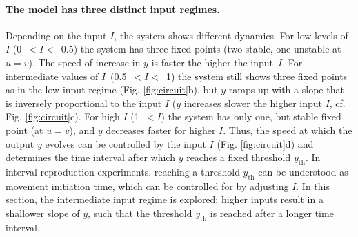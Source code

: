 \documentclass[10pt, a4paper]{article}
\begin{document}
\paragraph{The model has three distinct input regimes.}
Depending on the input $I$, the system shows different dynamics.
For low levels of~$I$ (0~$<I<$~0.5) the system has three fixed points (two stable, one unstable at $u=v$). 
The speed of increase in $y$ is faster the higher the input~$I$. 
For intermediate values of $I$~(0.5~$<I<$~1) the system still shows three fixed points as in the low input regime (Fig. \ref{fig:circuit}b), but $y$ ramps up with a slope that is inversely proportional to the input $I$ ($y$ increases slower the higher input $I$, cf. Fig. \ref{fig:circuit}c). 
For high $I$ (1~$<I$) the system has only one, but stable fixed point (at $u=v$), and $y$ decreases faster for higher $I$.
Thus, the speed at which the output $y$ evolves can be controlled by the input $I$ (Fig. \ref{fig:circuit}d) and determines the time interval after which $y$ reaches a fixed threshold $y_{\text{th}}$. 
In interval reproduction experiments, reaching a threshold $y_{\text{th}}$ can be understood as movement initiation time, which can be controlled for by adjusting $I$.
In this section, the intermediate input regime is explored: higher inputs result in a shallower slope of $y$, such that the threshold $y_{\text{th}}$ is reached after a longer time interval.
\end{document}
